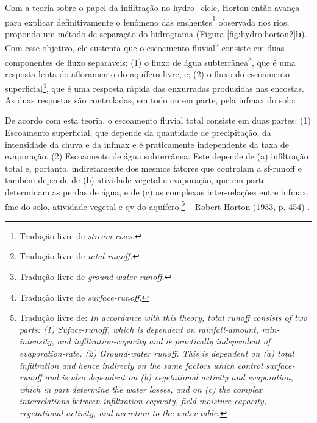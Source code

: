 \documentclass[./main.tex]{subfiles}
\begin{document}
\par Com a \gls{teoria} sobre o papel da infiltração no \gls{hydro_cicle}, Horton então avança para explicar definitivamente o fenômeno das enchentes\footnote{Tradução livre de \textit{stream rises}.} observada nos rios, propondo um método de separação do hidrograma (Figura \ref{fig:hydro:horton2}\textbf{b}). Com esse objetivo, ele sustenta que o escoamento fluvial\footnote{Tradução livre de \textit{total runoff}.} consiste em duas componentes de fluxo separáveis: (1) o fluxo de água subterrânea\footnote{Tradução livre de \textit{ground-water runoff}.}, que é uma resposta lenta do afloramento do aquífero livre, e; (2) o fluxo do escoamento superficial\footnote{Tradução livre de \textit{surface-runoff}.}, que é uma resposta rápida das enxurradas produzidas nas encostas. As duas respostas são controladas, em todo ou em parte, pela \gls{infmax} do solo:

\begin{adjustwidth}{100pt}{0pt}
\medskip
\small De acordo com esta \gls{teoria}, o escoamento fluvial total consiste em duas partes: (1) Escoamento superficial, que depende da quantidade de precipitação, da intensidade da chuva e da \gls{infmax} e é praticamente independente da taxa de evaporação. (2) Escoamento de água subterrânea. Este depende de (a) infiltração total e, portanto, indiretamente dos mesmos fatores que controlam a \gls{sf-runoff} e também depende de (b) atividade vegetal e evaporação, que em parte determinam as perdas de água, e de (c) as complexas inter-relações entre \gls{infmax}, \gls{fmc} do solo, atividade vegetal e \gls{qv} do aquífero.\footnote{Tradução livre de: \textit{In accordance with this theory, total runoff consists of two parts: (1) Suface-runoff, which is dependent on rainfall-amount, rain-intensity, and infiltration-capacity and is practically independent of evaporation-rate. (2) Ground-water runoff. This is dependent on (a) total infiltration and hence indirecty on the same factors which control surface-runoff and is also dependent on (b) vegetational activity and evaporation, which in part determine the water losses, and on (c) the complex interrelations between infiltration-capacity, field moisture-capacity, vegetational activity, and accretion to the water-table.}} -- Robert Horton (1933, p. 454) \cite{Horton1933}.
\medskip
\end{adjustwidth}
\end{document}
